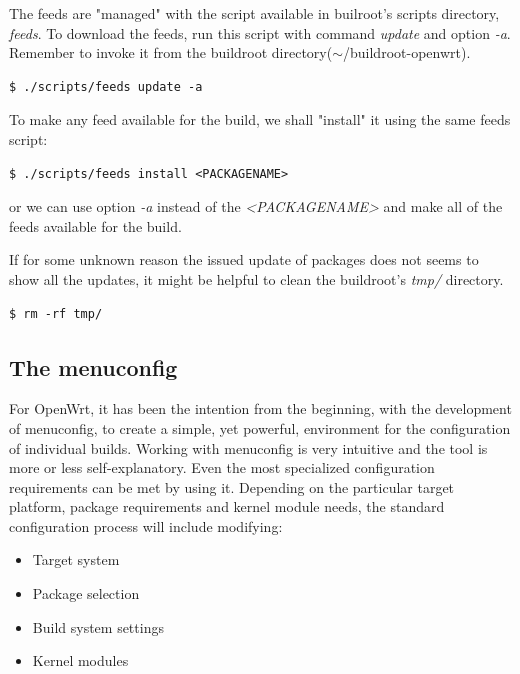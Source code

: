 The feeds are "managed" with the script available in builroot's scripts directory, {\it feeds}.
To download the feeds, run this script with command {\it update} and option {\it -a}.
Remember to invoke it from the buildroot directory($\sim$/buildroot-openwrt).
\begin{lstlisting}[columns=fixed,basicstyle=\ttfamily\footnotesize,tabsize=4,backgroundcolor=\color{yellow!10}]
$ ./scripts/feeds update -a
\end{lstlisting}

To make any feed available for the build, we shall "install" it using the same feeds script:
\begin{lstlisting}[columns=fixed,basicstyle=\ttfamily\footnotesize,tabsize=4,backgroundcolor=\color{yellow!10}]
$ ./scripts/feeds install <PACKAGENAME>
\end{lstlisting}
or we can use option {\it -a} instead of the {\it <PACKAGENAME>} and make all of the feeds available for the build.

If for some unknown reason the issued update of packages does not seems to show all the updates, it might be helpful to clean the buildroot's {\it tmp/} directory\cite{feeds}.
\begin{lstlisting}[columns=fixed,basicstyle=\ttfamily\footnotesize,tabsize=4,backgroundcolor=\color{yellow!10}]
$ rm -rf tmp/
\end{lstlisting}

\subsection{The menuconfig}

For OpenWrt, it has been the intention from the beginning, with the development of menuconfig, to create a simple, yet powerful, environment for the configuration of individual builds.
Working with menuconfig is very intuitive and the tool is more or less self-explanatory.
Even the most specialized configuration requirements can be met by using it.
Depending on the particular target platform, package requirements and kernel module needs, the standard configuration process will include modifying:
\begin{itemize}
    \item Target system
    \item Package selection
    \item Build system settings
    \item Kernel modules
\end{itemize}

